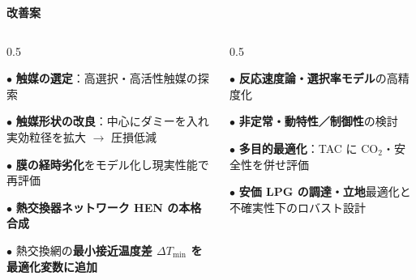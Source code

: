 \begin{frame}[t]
  \vspace{0.3em}

  {\footnotesize\bfseries\color{HeaderBlue} 改善案}\par
  \vspace{0.2em}
  {\scriptsize\setlength{\parskip}{0.1em}
   \begin{columns}[T,onlytextwidth]
    \begin{column}{0.5\textwidth}
      \raggedright
      $\bullet$ \textbf{触媒の選定}：高選択・高活性触媒の探索\par
      $\bullet$ \textbf{触媒形状の改良}：中心にダミーを入れ実効粒径を拡大 $\to$ 圧損低減\par
      $\bullet$ \textbf{膜の経時劣化}をモデル化し現実性能で再評価\par
      $\bullet$ \textbf{熱交換器ネットワーク HEN の本格合成}\par
      $\bullet$ 熱交換網の\textbf{最小接近温度差 $\Delta T_{\min}$ を最適化変数に追加}\par
    \end{column}
    \begin{column}{0.5\textwidth}
      \raggedright
      $\bullet$ \textbf{反応速度論・選択率モデル}の高精度化\par
      $\bullet$ \textbf{非定常・動特性／制御性}の検討\par
      $\bullet$ \textbf{多目的最適化}：TAC に $\mathrm{CO_2}$・安全性を併せ評価\par
      $\bullet$ \textbf{安価 LPG の調達・立地}最適化と不確実性下のロバスト設計\par
    \end{column}
   \end{columns}}

\end{frame}
